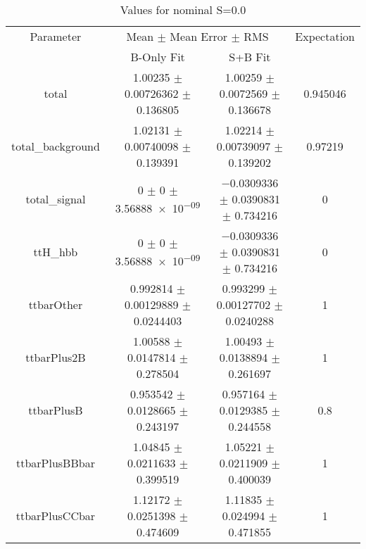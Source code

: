 \begin{table}
\centering
\caption{Values for nominal S=0.0}
\begin{tabular}{cccc}
\toprule
Parameter & \multicolumn{2}{c}{Mean $\pm$ Mean Error $\pm$ RMS} & Expectation\\
 & B-Only Fit & S+B Fit & \\
\midrule
total & \num{1.00235} $\pm$ \num{0.00726362} $\pm$ \num{0.136805} & \num{1.00259} $\pm$ \num{0.0072569} $\pm$ \num{0.136678} & \num{0.945046}\\
total\_background & \num{1.02131} $\pm$ \num{0.00740098} $\pm$ \num{0.139391} & \num{1.02214} $\pm$ \num{0.00739097} $\pm$ \num{0.139202} & \num{0.97219}\\
total\_signal & \num{0} $\pm$ \num{0} $\pm$ \num{3.56888e-09} & \num{-0.0309336} $\pm$ \num{0.0390831} $\pm$ \num{0.734216} & \num{0}\\
ttH\_hbb & \num{0} $\pm$ \num{0} $\pm$ \num{3.56888e-09} & \num{-0.0309336} $\pm$ \num{0.0390831} $\pm$ \num{0.734216} & \num{0}\\
ttbarOther & \num{0.992814} $\pm$ \num{0.00129889} $\pm$ \num{0.0244403} & \num{0.993299} $\pm$ \num{0.00127702} $\pm$ \num{0.0240288} & \num{1}\\
ttbarPlus2B & \num{1.00588} $\pm$ \num{0.0147814} $\pm$ \num{0.278504} & \num{1.00493} $\pm$ \num{0.0138894} $\pm$ \num{0.261697} & \num{1}\\
ttbarPlusB & \num{0.953542} $\pm$ \num{0.0128665} $\pm$ \num{0.243197} & \num{0.957164} $\pm$ \num{0.0129385} $\pm$ \num{0.244558} & \num{0.8}\\
ttbarPlusBBbar & \num{1.04845} $\pm$ \num{0.0211633} $\pm$ \num{0.399519} & \num{1.05221} $\pm$ \num{0.0211909} $\pm$ \num{0.400039} & \num{1}\\
ttbarPlusCCbar & \num{1.12172} $\pm$ \num{0.0251398} $\pm$ \num{0.474609} & \num{1.11835} $\pm$ \num{0.024994} $\pm$ \num{0.471855} & \num{1}\\
\bottomrule
\end{tabular}
\end{table}